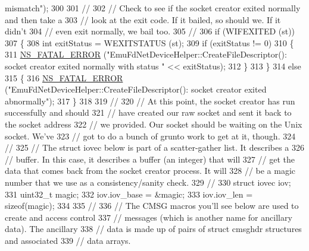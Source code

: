 \begin{DoxyCode}
{       mismatch"});
300 
301       \textcolor{comment}{//}
302       \textcolor{comment}{// Check to see if the socket creator exited normally and then take a}
303       \textcolor{comment}{// look at the exit code.  If it bailed, so should we.  If it didn't}
304       \textcolor{comment}{// even exit normally, we bail too.}
305       \textcolor{comment}{//}
306       \textcolor{keywordflow}{if} (WIFEXITED (st))
307         \{
308           \textcolor{keywordtype}{int} exitStatus = WEXITSTATUS (st);
309           \textcolor{keywordflow}{if} (exitStatus != 0)
310             \{
311               \hyperlink{group__fatal_ga5131d5e3f75d7d4cbfd706ac456fdc85}{NS\_FATAL\_ERROR} (\textcolor{stringliteral}{"EmuFdNetDeviceHelper::CreateFileDescriptor(): socket creator
       exited normally with status "} << exitStatus);
312             \}
313         \}
314       \textcolor{keywordflow}{else}
315         \{
316           \hyperlink{group__fatal_ga5131d5e3f75d7d4cbfd706ac456fdc85}{NS\_FATAL\_ERROR} (\textcolor{stringliteral}{"EmuFdNetDeviceHelper::CreateFileDescriptor(): socket creator
       exited abnormally"});
317         \}
318 
319       \textcolor{comment}{//}
320       \textcolor{comment}{// At this point, the socket creator has run successfully and should}
321       \textcolor{comment}{// have created our raw socket and sent it back to the socket address}
322       \textcolor{comment}{// we provided.  Our socket should be waiting on the Unix socket.  We've}
323       \textcolor{comment}{// got to do a bunch of grunto work to get at it, though.}
324       \textcolor{comment}{//}
325       \textcolor{comment}{// The struct iovec below is part of a scatter-gather list.  It describes a}
326       \textcolor{comment}{// buffer.  In this case, it describes a buffer (an integer) that will}
327       \textcolor{comment}{// get the data that comes back from the socket creator process.  It will}
328       \textcolor{comment}{// be a magic number that we use as a consistency/sanity check.}
329       \textcolor{comment}{//}
330       \textcolor{keyword}{struct }iovec iov;
331       uint32\_t magic;
332       iov.iov\_base = &magic;
333       iov.iov\_len = \textcolor{keyword}{sizeof}(magic);
334 
335       \textcolor{comment}{//}
336       \textcolor{comment}{// The CMSG macros you'll see below are used to create and access control}
337       \textcolor{comment}{// messages (which is another name for ancillary data).  The ancillary}
338       \textcolor{comment}{// data is made up of pairs of struct cmsghdr structures and associated}
339       \textcolor{comment}{// data arrays.}

\end{DoxyCode}
